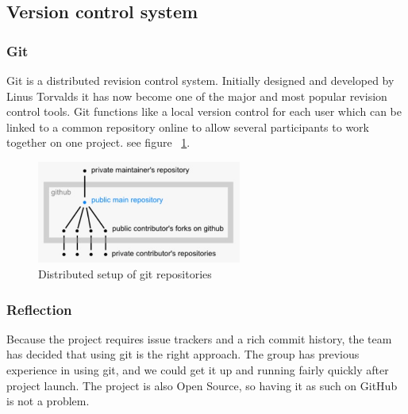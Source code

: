 \newpage
\subsection{Version control system}

\subsubsection{Git}
Git is a distributed revision control system. Initially designed and developed by Linus Torvalds 
it has now become one of the major and most popular revision control tools.
Git functions like a local version control for each user which can be linked to a common repository 
online to allow several participants to work together on one project. see figure ~\ref{fig:github}.

\begin{figure}[htb]
	\centering
	\includegraphics[width=0.6\textwidth]{organizational/github.jpg}
	\caption{Distributed setup of git repositories\cite{git:repositories}}
	\label{fig:github}
\end{figure}

\subsubsection{Reflection}
Because the project requires issue trackers and a rich commit history, the team has decided that using git is the right approach. The group has previous experience in using git, and we could get it up and running fairly quickly after project launch. The project is also Open Source, so having it as such on GitHub is not a problem.
